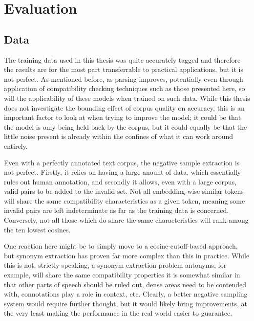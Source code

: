 \documentclass[a4paper, 12pt]{article}
\begin{document}
\section{Evaluation}

\subsection{Data}
The training data used in this thesis was quite accurately tagged and therefore the results are for the most part transferrable to practical applications, but it is not perfect. As mentioned before, as parsing improves, potentially even through application of compatibility checking techniques such as those presented here, so will the applicability of these models when trained on such data. While this thesis does not investigate the bounding effect of corpus quality on accuracy, this is an important factor to look at when trying to improve the model; it could be that the model is only being held back by the corpus, but it could equally be that the little noise present is already within the confines of what it can work around entirely.

Even with a perfectly annotated text corpus, the negative sample extraction is not perfect. Firstly, it relies on having a large anount of data, which essentially rules out human annotation, and secondly it allows, even with a large corpus, valid pairs to be added to the invalid set. Not all embedding-wise similar tokens will share the same compatibility characteristics as a given token, meaning some invalid pairs are left indeterminate as far as the training data is concerned. Conversely, not all those which do share the same characteristics will rank among the ten lowest cosines.

One reaction here might be to simply move to a cosine-cutoff-based approach, but synonym extraction has proven far more complex than this in practice. While this is not, strictly speaking, a synonym extraction problem \textemdash antonyms, for example, will share the same compatibility properties \textemdash it is somewhat similar in that other parts of speech should be ruled out, dense areas need to be contended with, connotations play a role in context, etc. Clearly, a better negative sampling system would require further thought, but it would likely bring improvements, at the very least making the performance in the real world easier to guarantee.
\end{document}
